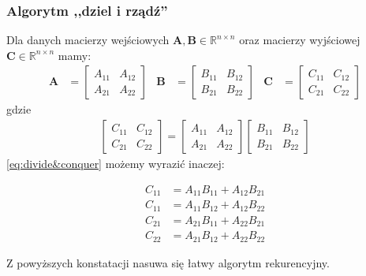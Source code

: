 \subsubsection{Algorytm ,,dziel i rządź''}
Dla danych macierzy wejściowych \(\mathbf{A}, \mathbf{B}\in\mathbb{R}^{n\times n}\) oraz macierzy wyjściowej \(\mathbf{C}\in\mathbb{R}^{n\times n}\) mamy:
\begin{align*}
\mathbf{A}& = \begin{bmatrix} A_{11}& A_{12} \\ A_{21}& A_{22} \end{bmatrix}&
\mathbf{B}& = \begin{bmatrix} B_{11}& B_{12} \\ B_{21}& B_{22} \end{bmatrix}&
\mathbf{C}& = \begin{bmatrix} C_{11}& C_{12} \\ C_{21}& C_{22} \end{bmatrix}
\end{align*}
gdzie
\begin{align}\label{eq:divide&conquer}
\begin{bmatrix} C_{11}& C_{12} \\ C_{21}& C_{22}\end{bmatrix}=
\begin{bmatrix} A_{11}& A_{12} \\ A_{21}& A_{22}\end{bmatrix}
\begin{bmatrix} B_{11}& B_{12} \\ B_{21}& B_{22}\end{bmatrix}
\end{align}
\eqref{eq:divide&conquer} możemy wyrazić inaczej:

\begin{equation}
\begin{split}
C_{11} &= A_{11}B_{11} + A_{12}B_{21}\\
C_{11} &= A_{11}B_{12} + A_{12}B_{22}\\
C_{21} &= A_{21}B_{11} + A_{22}B_{21}\\
C_{22} &= A_{21}B_{12} + A_{22}B_{22}
\end{split}
\end{equation}

Z powyższych konstatacji nasuwa się łatwy algorytm rekurencyjny.

